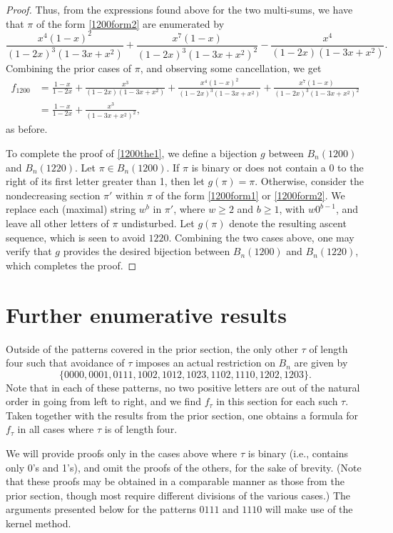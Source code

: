 \documentclass{article}
\theoremstyle{remark}
\theoremstyle{plain}
\begin{document}
\begin{proof}
Thus, from the expressions found above for the two multi-sums, we have that $\pi$ of the form \eqref{1200form2} are enumerated by
$$\frac{x^4(1-x)^2}{(1-2x)^3(1-3x+x^2)}+\frac{x^7(1-x)}{(1-2x)^3(1-3x+x^2)^2}-\frac{x^4}{(1-2x)(1-3x+x^2)}.$$
Combining the prior cases of $\pi$, and observing some cancellation, we get
\begin{align*}
f_{1200}&=\frac{1-x}{1-2x}+\frac{x^3}{(1-2x)(1-3x+x^2)}+\frac{x^4(1-x)^2}{(1-2x)^3(1-3x+x^2)}+\frac{x^7(1-x)}{(1-2x)^3(1-3x+x^2)^2}\\
&=\frac{1-x}{1-2x}+\frac{x^3}{(1-3x+x^2)^2},
\end{align*}
as before.

To complete the proof of \eqref{1200the1}, we define a bijection $g$ between $B_n(1200)$ and $B_n(1220)$.  Let $\pi \in B_n(1200)$.  If $\pi$ is binary or does not contain a 0 to the right of its first letter greater than 1, then let $g(\pi)=\pi$.  Otherwise, consider the nondecreasing section $\pi'$ within $\pi$ of the form \eqref{1200form1} or \eqref{1200form2}.  We replace each (maximal) string $w^b$ in $\pi'$, where $w \geq 2$ and $b \geq 1$, with $w0^{b-1}$, and leave all other letters of $\pi$ undisturbed.  Let $g(\pi)$ denote the resulting ascent sequence, which is seen to avoid $1220$.  Combining the two cases above, one may verify that $g$ provides the desired bijection between $B_n(1200)$ and $B_n(1220)$, which completes the proof.
\end{proof}

\section{Further enumerative results}

Outside of the patterns covered in the prior section, the only other $\tau$ of length four such that avoidance of $\tau$ imposes an actual restriction on $B_n$ are given by $$\{0000,0001,0111,1002,1012,1023,1102,1110,1202,1203\}.$$
Note that in each of these patterns, no two positive letters are out of the natural order in going from left to right, and we find $f_\tau$  in this section for each such $\tau$. Taken together with the results from the prior section, one obtains a formula for $f_\tau$ in all cases where $\tau$ is of length four.

We will provide proofs only in the cases above where $\tau$ is binary (i.e., contains only 0's and 1's), and omit the proofs of the others, for the sake of brevity.  (Note that these proofs may be obtained in a comparable manner as those from the prior section, though most require different divisions of the various cases.)  The arguments presented below for the patterns $0111$ and $1110$ will make use of the kernel method.
\end{document}
